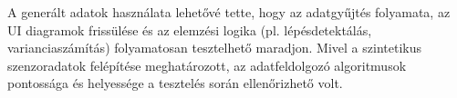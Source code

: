 A generált adatok használata lehetővé tette, hogy az adatgyűjtés folyamata, az UI
diagramok frissülése és az elemzési logika (pl. lépésdetektálás, varianciaszámítás)
folyamatosan tesztelhető maradjon. Mivel a szintetikus szenzoradatok felépítése
meghatározott, az adatfeldolgozó algoritmusok pontossága és helyessége a tesztelés
során ellenőrizhető volt.

